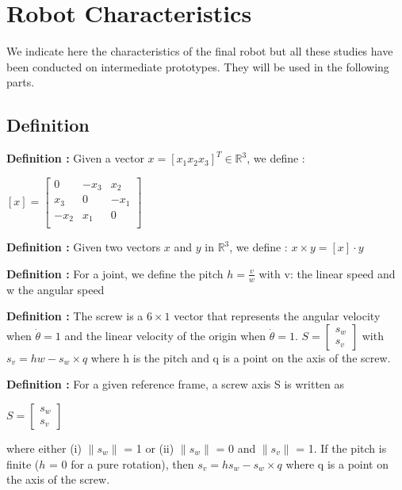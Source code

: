 \section{Robot Characteristics}\insertloftspace
\setcounter{figure}{0}\setcounter{table}{0}

We indicate here the characteristics of the final robot but all these studies have been conducted on intermediate prototypes. They will be used in the following parts.

\subsection{Definition}

\textbf{Definition :} Given a vector $x=[x_1 x_2 x_3]^T \in \mathbb{R}^3$, we define : 
\begin{center}
    $[x] = \begin{bmatrix}
        0 & -x_3 & x_2 \\
        x_3 & 0 & -x_1 \\
        -x_2 & x_1 & 0 \\
    \end{bmatrix}$
\end{center}

\noindent\textbf{Definition :} Given two vectors $x$ and $y$ in $\mathbb{R}^3$, we define : $x\times y = [x]\cdot y$

\bigbreak
\noindent\textbf{Definition :} For a joint, we define the pitch $h = \frac{v}{w}$ with v: the linear speed and w the angular speed

\bigbreak
\noindent\textbf{Definition :} The screw is a $6\times1$ vector that represents the angular velocity when $\dot{\theta}=1$ and the linear velocity of the origin when $\dot{\theta}=1$. $S = \begin{bmatrix} s_w\\s_v\end{bmatrix}$ with $s_v = hw-s_w\times q$ where h is the pitch and q is a point on the axis of the screw.

\noindent\textbf{Definition :} For a given reference frame, a screw axis S is written as 
\begin{center}
    $S=\begin{bmatrix}
        s_w\\s_v
    \end{bmatrix}$
\end{center}
where either (i) $\|s_w\|$ = 1 or (ii) $\|s_w\|$ = 0 and $\|s_v\|$ = 1. If the pitch is finite ($h$ = 0 for a pure rotation), then $s_v = hs_w-s_w\times q$ where q is a point on the axis of the screw.

